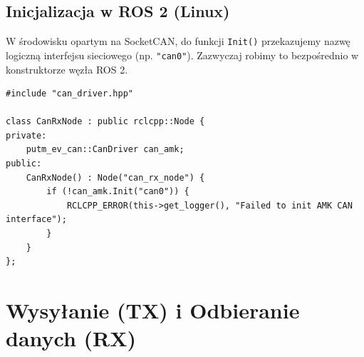\documentclass[a4paper,11pt]{article}
\begin{document}
\vspace{1em}

\begin{ros2box}
\subsection*{Inicjalizacja w ROS 2 (Linux)}
W środowisku opartym na SocketCAN, do funkcji \texttt{Init()} przekazujemy nazwę logiczną interfejsu sieciowego (np. \texttt{"can0"}). Zazwyczaj robimy to bezpośrednio w konstruktorze węzła ROS 2.

\begin{lstlisting}
#include "can_driver.hpp"

class CanRxNode : public rclcpp::Node {
private:
    putm_ev_can::CanDriver can_amk;
public:
    CanRxNode() : Node("can_rx_node") {
        if (!can_amk.Init("can0")) {
            RCLCPP_ERROR(this->get_logger(), "Failed to init AMK CAN interface");
        }
    }
};
\end{lstlisting}
\end{ros2box}

\newpage

\section{Wysyłanie (TX) i Odbieranie danych (RX)}
\end{document}
